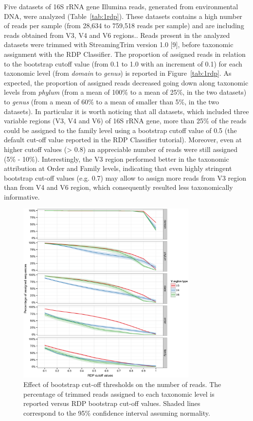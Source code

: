 Five datasets of 16S rRNA gene Illumina reads, generated from environmental DNA, were analyzed (Table~\ref{tab:1rdp}). These datasets contains a high number of reads per sample (from 28,634 to 759,518 reads per sample) and are including reads obtained from V3, V4 and V6 regions.. Reads present in the analyzed datasets were trimmed with StreamingTrim version 1.0 [9], before taxonomic assignment with the RDP Classifier. The proportion of assigned reads in relation to the bootstrap cutoff value (from 0.1 to 1.0 with an increment of 0.1) for each taxonomic level (from \textit{domain} to \textit{genus}) is reported in Figure~\ref{tab:1rdp}. As expected, the proportion of assigned reads decreased going down along taxonomic levels from \textit{phylum} (from a mean of 100\% to a mean of 25\%, in the two datasets) to \textit{genus} (from a mean of 60\% to a mean of smaller than 5\%, in the two datasets). In particular it is worth noticing that all datasets, which included three variable regions (V3, V4 and V6) of 16S rRNA gene, more than 25\% of the reads could be assigned to the family level using a bootstrap cutoff value of 0.5 (the default cut-off value reported in the RDP Classifier tutorial). Moreover, even at higher cutoff values ({\textgreater} 0.8) an appreciable number of reads were still assigned (5\% - 10\%). Interestingly, the V3 region performed better in the taxonomic attribution at Order and Family levels, indicating that even highly stringent bootstrap cut-off values (e.g. 0.7) may allow to assign more reads from V3 region than from V4 and V6 region, which consequently resulted less taxonomically informative.\\%
\begin{figure}[!tb]
	\centering
	\includegraphics[width=0.8\textwidth]{./figures/Chapter_2/Figure_1}
  	\caption{\label{fig:1rdp}Effect of bootstrap cut-off thresholds on the number of reads. The percentage of trimmed reads assigned to each taxonomic level is reported versus RDP bootstrap cut-off values. Shaded lines correspond to the 95\% confidence interval assuming normality.}
\end{figure}%
